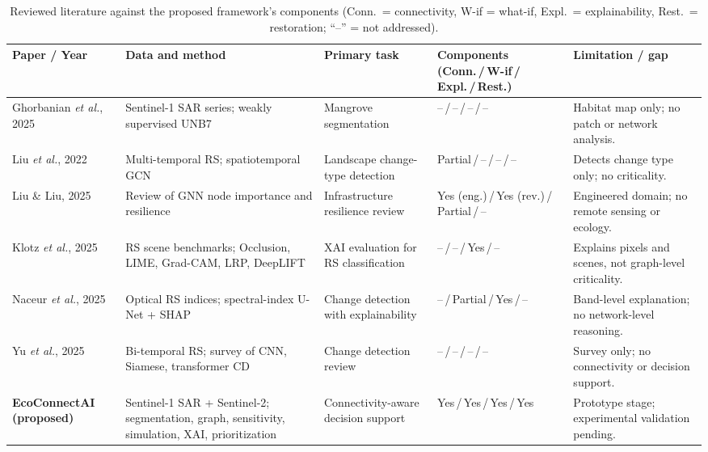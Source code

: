 \documentclass[conference]{IEEEtran}
\begin{document}
\begin{table}[!t]
\centering
\caption{Reviewed literature against the proposed framework's components (Conn.\ = connectivity, W-if = what-if, Expl.\ = explainability, Rest.\ = restoration; ``--'' = not addressed).}
\label{tab:litcomparison}
\tiny
\renewcommand{\arraystretch}{0.95}
\begin{tabularx}{\textwidth}{@{}>{\raggedright\arraybackslash}p{2.3cm}>{\raggedright\arraybackslash}p{4.2cm}>{\raggedright\arraybackslash}p{2.9cm}>{\raggedright\arraybackslash}p{3.5cm}>{\raggedright\arraybackslash}X@{}}
\toprule
\textbf{Paper / Year} & \textbf{Data and method} & \textbf{Primary task} & \textbf{Components (Conn.\,/\,W-if\,/\,Expl.\,/\,Rest.)} & \textbf{Limitation / gap} \\
\midrule
Ghorbanian \emph{et al.}, 2025~\cite{ghorbanian2025mangrove} & Sentinel-1 SAR series; weakly supervised UNB7 & Mangrove segmentation & --\,/\,--\,/\,--\,/\,-- & Habitat map only; no patch or network analysis. \\
Liu \emph{et al.}, 2022~\cite{liu2022hybrid} & Multi-temporal RS; spatiotemporal GCN & Landscape change-type detection & Partial\,/\,--\,/\,--\,/\,-- & Detects change type only; no criticality. \\
Liu \& Liu, 2025~\cite{liu2025gnnresilience} & Review of GNN node importance and resilience & Infrastructure resilience review & Yes (eng.)\,/\,Yes (rev.)\,/\,Partial\,/\,-- & Engineered domain; no remote sensing or ecology. \\
Klotz \emph{et al.}, 2025~\cite{klotz2025xai} & RS scene benchmarks; Occlusion, LIME, Grad-CAM, LRP, DeepLIFT & XAI evaluation for RS classification & --\,/\,--\,/\,Yes\,/\,-- & Explains pixels and scenes, not graph-level criticality. \\
Naceur \emph{et al.}, 2025~\cite{naceur2025unet} & Optical RS indices; spectral-index U-Net + SHAP & Change detection with explainability & --\,/\,Partial\,/\,Yes\,/\,-- & Band-level explanation; no network-level reasoning. \\
Yu \emph{et al.}, 2025~\cite{yu2025changedetection} & Bi-temporal RS; survey of CNN, Siamese, transformer CD & Change detection review & --\,/\,--\,/\,--\,/\,-- & Survey only; no connectivity or decision support. \\
\textbf{EcoConnectAI (proposed)} & Sentinel-1 SAR + Sentinel-2; segmentation, graph, sensitivity, simulation, XAI, prioritization & Connectivity-aware decision support & Yes\,/\,Yes\,/\,Yes\,/\,Yes & Prototype stage; experimental validation pending. \\
\bottomrule
\end{tabularx}
\end{table}
\end{document}
